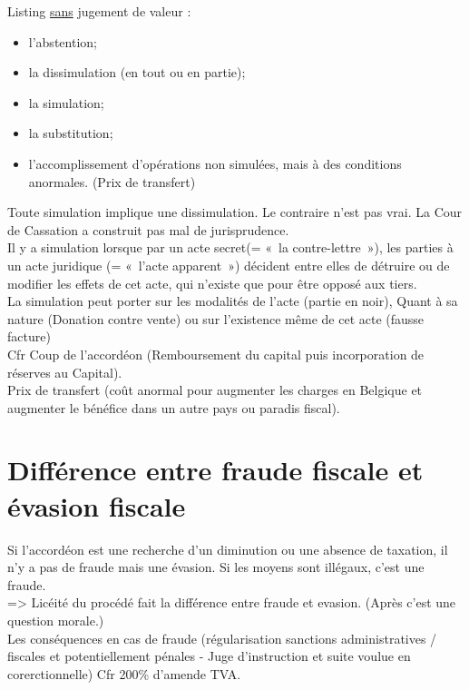 \documentclass{book}
\begin{document}
Listing \underline{sans} jugement de valeur :\\
   
\begin{itemize}
\item l'abstention;
\item la dissimulation (en tout ou en partie);
\item la simulation;
\item la substitution;
\item l'accomplissement d'opérations non simulées, mais à des conditions anormales. (Prix de transfert)
\end{itemize}
 \null  
   Toute simulation implique une dissimulation. Le contraire n'est pas vrai. La Cour de Cassation a construit pas mal de jurisprudence.\\
   
   Il y a simulation lorsque par un acte secret(= «~la contre-lettre~»), les parties à un acte juridique (= «~l'acte apparent~») décident entre elles de détruire ou de modifier les effets de cet acte, qui n'existe que pour être opposé aux tiers.\\
   
   La simulation peut porter sur les modalités de l'acte (partie en noir), Quant à sa nature (Donation contre vente) ou sur l'existence même de cet acte (fausse facture)\\
   
   Cfr Coup de l'accordéon (Remboursement du capital puis incorporation de réserves au Capital).\\
   
   Prix de transfert (coût anormal pour augmenter les charges en Belgique et augmenter le bénéfice dans un autre pays ou paradis fiscal).\\


\section{Différence entre fraude fiscale et évasion fiscale}

Si l'accordéon est une recherche d'un diminution ou une absence de taxation, il n'y a pas de fraude mais une évasion. Si les moyens sont illégaux, c'est une fraude.\\

=> Licéité du procédé fait la différence entre fraude et evasion. (Après c'est une question morale.)\\

Les conséquences en cas de fraude (régularisation sanctions administratives / fiscales et potentiellement pénales - Juge d'instruction et suite voulue en corerctionnelle) Cfr 200\% d'amende TVA. \\
\end{document}
